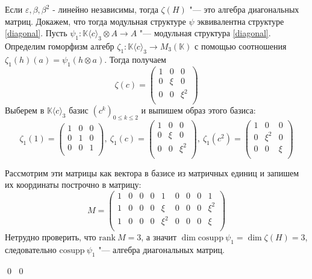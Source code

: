 \documentclass[12pt, reqno, a4paper, oneside, notitlepage]{amsart}
\makeatletter
\theoremstyle{mytheoremstyle}
\theoremstyle{myremarkstyle}
\numberwithin{equation}{section}
\renewenvironment{proof}[1][\proofname]{\par\indent {\bfseries #1\@addpunct{.} }}{\qed}
\makeatother
\begin{document}
\begin{proof}
\begin{proof}
    Если $\varepsilon, \beta, \beta^2$ - линейно независимы, тогда $\zeta(H)$ "--- это алгебра диагональных матриц. 
    Докажем, что тогда модульная структуре $\psi$ эквивалентна структуре \ref{diagonal}.
    Пусть $\psi_1: \mathbb{K}\langle c\rangle_3 \otimes A \to A$ "--- модульная структура \ref{diagonal}.
    Определим гоморфизм алгебр $\zeta_1:\mathbb{K}\langle c\rangle_3 \to M_3(\mathbb{K})$ с помощью соотношения ${\zeta_1(h)(a)=\psi_1(h \otimes a)}$. Тогда получаем \[
    \zeta(c) = \begin{pmatrix}
        1 & 0 & 0\\
        0 & \xi & 0\\
        0 & 0 & \xi^2\\
    \end{pmatrix}
    \]
    Выберем в $\mathbb{K}\langle c\rangle_3$  базис $(c^k)_{0 \leq k \leq 2}$ и выпишем образ этого базиса:
    \[
    \zeta_1(1) = \begin{pmatrix}
        1 & 0 & 0\\
        0 & 1 & 0\\
        0 & 0 & 1\\
    \end{pmatrix},\
    \zeta_1(c) = \begin{pmatrix}
        1 & 0 & 0\\
        0 & \xi & 0\\
        0 & 0 & \xi^2\\
    \end{pmatrix},\ 
    \zeta_1(c^2) = \begin{pmatrix}
        1 & 0 & 0\\
        0 & \xi^2 & 0\\
        0 & 0 & \xi\\
    \end{pmatrix}
    \]

    Рассмотрим эти матрицы как вектора в базисе из матричных единиц и запишем их координаты построчно в матрицу: \[
        M = \begin{pmatrix}
            1 & 0 & 0 & 0 & 1 & 0 & 0 & 0 & 1\\
            1 & 0 & 0 & 0 & \xi & 0 & 0 & 0 & \xi^2\\
            1 & 0 & 0 & 0 & \xi^2 & 0 & 0 & 0 & \xi\\
        \end{pmatrix}
    \]
    Нетрудно проверить, что $\mathrm{rank}\ M = 3$, а значит $\dim \mathrm{cosupp}\ \psi_1 = \dim \zeta(H) = 3$, следовательно $\mathrm{cosupp}\ \psi_1$ "--- алгебра диагональных матриц.


\end{proof}
\end{proof}
\end{document}
